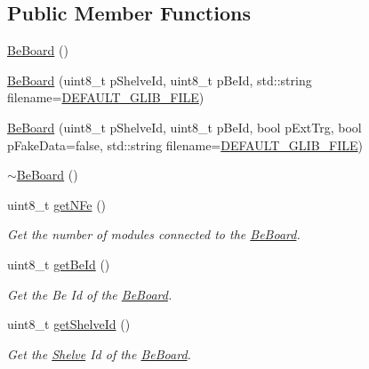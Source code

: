 \subsection*{Public Member Functions}
\begin{DoxyCompactItemize}
\item 
\hyperlink{class_ph2___hw_description_1_1_be_board_a3bd1302a3dbf6ff0ba59dab710cfa537}{Be\-Board} ()
\item 
\hyperlink{class_ph2___hw_description_1_1_be_board_a62264acdf687d188214a8cded8e022db}{Be\-Board} (uint8\-\_\-t p\-Shelve\-Id, uint8\-\_\-t p\-Be\-Id, std\-::string filename=\hyperlink{_definition_8h_a9a33e5f7e6ec12c2dd3f55317c6c16f1}{D\-E\-F\-A\-U\-L\-T\-\_\-\-G\-L\-I\-B\-\_\-\-F\-I\-L\-E})
\item 
\hyperlink{class_ph2___hw_description_1_1_be_board_a23bb0b31d566ba70544d9a45e2bdcfa6}{Be\-Board} (uint8\-\_\-t p\-Shelve\-Id, uint8\-\_\-t p\-Be\-Id, bool p\-Ext\-Trg, bool p\-Fake\-Data=false, std\-::string filename=\hyperlink{_definition_8h_a9a33e5f7e6ec12c2dd3f55317c6c16f1}{D\-E\-F\-A\-U\-L\-T\-\_\-\-G\-L\-I\-B\-\_\-\-F\-I\-L\-E})
\item 
\hyperlink{class_ph2___hw_description_1_1_be_board_a9e763718213e7106b7a6ba1ccb5d23e2}{$\sim$\-Be\-Board} ()
\item 
uint8\-\_\-t \hyperlink{class_ph2___hw_description_1_1_be_board_a2fa9bc6ee1db78f046186117f162eb1e}{get\-N\-Fe} ()
\begin{DoxyCompactList}\small\item\em Get the number of modules connected to the \hyperlink{class_ph2___hw_description_1_1_be_board}{Be\-Board}. \end{DoxyCompactList}\item 
uint8\-\_\-t \hyperlink{class_ph2___hw_description_1_1_be_board_a81c2071b04bb2c4541f0b30bcf2ff1ba}{get\-Be\-Id} ()
\begin{DoxyCompactList}\small\item\em Get the Be Id of the \hyperlink{class_ph2___hw_description_1_1_be_board}{Be\-Board}. \end{DoxyCompactList}\item 
uint8\-\_\-t \hyperlink{class_ph2___hw_description_1_1_be_board_af241f127cad3f32dc0aad9bcc6422f2a}{get\-Shelve\-Id} ()
\begin{DoxyCompactList}\small\item\em Get the \hyperlink{class_ph2___hw_description_1_1_shelve}{Shelve} Id of the \hyperlink{class_ph2___hw_description_1_1_be_board}{Be\-Board}. \end{DoxyCompactList}\item 

\end{DoxyCompactItemize}
